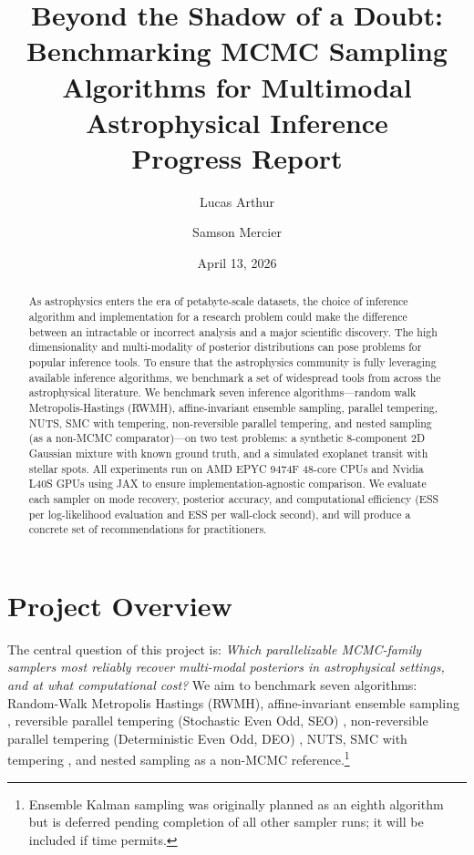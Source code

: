 \documentclass{article}
\title{Beyond the Shadow of a Doubt: Benchmarking MCMC Sampling Algorithms
  for Multimodal Astrophysical Inference\\[0.5em]
  \large Progress Report}
\author{Lucas Arthur \and Samson Mercier}
\date{April 13, 2026}
\begin{document}
\maketitle

\begin{abstract}
As astrophysics enters the era of petabyte-scale datasets, the choice of
inference algorithm and implementation for a research problem could make the
difference between an intractable or incorrect analysis and a major scientific
discovery. The high dimensionality and multi-modality of posterior distributions
can pose problems for popular inference tools. To ensure that the astrophysics
community is fully leveraging available inference algorithms, we benchmark a
set of widespread tools from across the astrophysical literature. We benchmark
seven inference algorithms---random walk Metropolis-Hastings (RWMH),
affine-invariant ensemble sampling, parallel tempering, NUTS, SMC with
tempering, non-reversible parallel tempering, and nested sampling (as a
non-MCMC comparator)---on two test problems: a synthetic
8-component 2D Gaussian mixture with known ground truth, and a simulated
exoplanet transit with stellar spots. All experiments run on AMD EPYC 9474F
48-core CPUs and Nvidia L40S GPUs using JAX to ensure
implementation-agnostic comparison. We evaluate each sampler on mode
recovery, posterior accuracy, and computational efficiency (ESS per log-likelihood evaluation and ESS per
wall-clock second), and will produce a concrete set of recommendations for practitioners.
\end{abstract}

\section{Project Overview}

The central question of this project is: \emph{Which parallelizable MCMC-family samplers most reliably recover multi-modal posteriors in astrophysical settings, and at what computational cost?} We aim to benchmark seven algorithms: Random-Walk Metropolis Hastings (RWMH), affine-invariant ensemble sampling \cite{goodman2010,emcee}, reversible parallel tempering (Stochastic Even Odd, SEO) \cite{vousden2016}, non-reversible parallel tempering (Deterministic Even Odd, DEO) \cite{syed2019}, NUTS, SMC with tempering \cite{delmoral2006}, and nested sampling \cite{speagle2020} as a non-MCMC reference.\footnote{Ensemble Kalman sampling \cite{garbuno2020} was originally planned as an eighth algorithm but is deferred pending completion of all other sampler runs; it will be included if time permits.}
\end{document}
